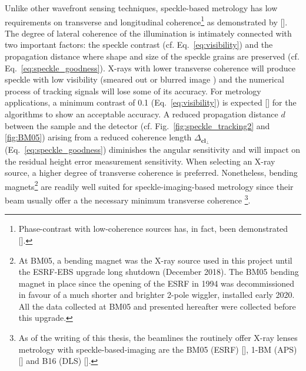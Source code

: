 \begin{refsection}
Unlike other wavefront sensing techniques, speckle-based metrology has low requirements on transverse and longitudinal coherence\footnote{Phase-contrast with low-coherence sources has, in fact, been demonstrated [\cite{Cloetens1996, Wilkins1996, Pfeiffer2006, Munro2012}].} as demonstrated by [\cite{Zanette2014,Zdora2015,Wang2016}]. The degree of lateral coherence of the illumination is intimately connected with two important factors: the speckle contrast (cf. Eq.~\ref{eq:visibility}) and the propagation distance where shape and size of the speckle grains are preserved (cf. Eq.~\ref{eq:speckle_goodness}). X-rays with lower transverse coherence will produce speckle with low visibility (smeared out or blurred image ) and the numerical process of tracking signals will lose some of its accuracy. For metrology applications, a minimum contrast of 0.1 (Eq.~\ref{eq:visibility}) is expected [\cite{Berujon2020a}] for the algorithms to show an acceptable accuracy. A reduced propagation distance $d$ between the sample and the detector (cf. Fig.~\ref{fig:speckle_tracking2} and \ref{fig:BM05}) arising from a reduced coherence length $\Delta_{\textbf{cl}_\perp}$ (Eq.~\ref{eq:speckle_goodness}) diminishes the angular sensitivity and will impact on the residual height error measurement sensitivity. When selecting an X-ray source, a higher degree of transverse coherence is preferred. Nonetheless, bending magnets\footnote{At BM05, a bending magnet was the X-ray source used in this project until the ESRF-EBS upgrade long shutdown (December 2018). The BM05 bending magnet in place since the opening of the ESRF in 1994 was decommissioned in favour of a much shorter and brighter 2-pole wiggler, installed early 2020. All the data collected at BM05 and presented hereafter were collected before this upgrade.} are readily well suited for  speckle-imaging-based metrology since their beam usually offer a the necessary minimum transverse coherence  \footnote{As of the writing of this thesis, the beamlines the routinely offer X-ray lenses metrology with speckle-based-imaging are the BM05 (ESRF) [\cite{Berujon2020a}], 1-BM (APS) [\cite{Qiao2020}] and B16 (DLS) [\cite{Sawhney2013}].}. 


\end{refsection}
